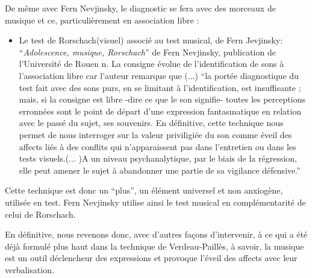 \documentclass[12pt,french]{report}
\makeatletter
\let\SF@@footnote\footnote
\def\footnote{\ifx\protect\@typeset@protect
    \expandafter\SF@@footnote
  \else
    \expandafter\SF@gobble@opt
  \fi
}
\edef\SF@gobble@opt{\noexpand\protect
  \expandafter\noexpand\csname SF@gobble@opt \endcsname}
\makeatother
\begin{document}
De même avec Fern Nevjinsky, le diagnostic se fera avec des morceaux
de musique et ce, particulièrement en association libre : 
\begin{itemize}
\item Le test de Rorschach(visuel) associé au test musical, de Fern Jevjinsky:
\footnote{``\emph{Adolescence, musique, Rorschach}'' de Fern Nevjinsky, publication
de l'Université de Rouen n. } La consigne évolue de l'identification de sons à l'association libre
car l'auteur remarque que (...) ``la portée diagnostique du test
fait avec des sons purs, en se limitant à l'identification, est insuffisante
; mais, si la consigne est libre -dire ce que le son signifie- toutes
les perceptions erronnées sont le point de départ d'une expression
fantasmatique en relation avec le passé du sujet, ses souvenirs. En
définitive, cette technique nous permet de nous interroger sur la
valeur priviligiée du son comme éveil des affects liés à des conflits
qui n'apparaissent pas dans l'entretien ou dans les tests visuels.(...
)A un niveau psychanalytique, par le biais de la régression, elle
peut amener le sujet à abandonner une partie de sa vigilance défensive.'' 
\end{itemize}
Cette technique est donc un ``plus'', un élément universel et non
anxiogène, utilisée en test. Fern Nevjinsky utilise ainsi le test
musical en complémentarité de celui de Rorschach.

En définitive, nous revenons donc, avec d'autres façons d'intervenir,
à ce qui a été déjà formulé plus haut dans la technique de Verdeau-Paillès,
à savoir, la musique est un outil déclencheur des expressions et provoque
l'éveil des affects avec leur verbalisation.
\end{document}
